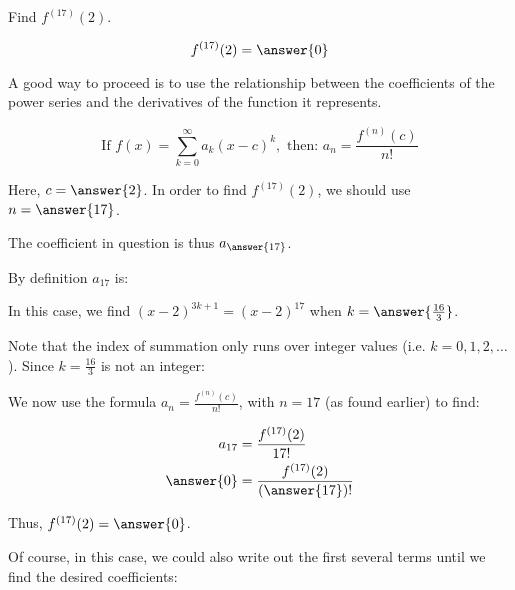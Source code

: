 \documentclass{ximera}
\begin{document}
\begin{exercise}
\begin{exercise}
Find $f^{(17)}(2)$.

\[
f^{(17)}(2) = \answer{0}
\]


\begin{hint}
A good way to proceed is to use the relationship between the coefficients of the power series and the derivatives of the function it represents.

\[
\textrm{If } f(x) = \sum_{k=0}^{\infty} a_k(x-c)^k, \textrm{ then: } a_n = \frac{f^{(n)}(c)}{n!}
\]

Here, $c=\answer{2}$.  In order to find $f^{(17)}(2)$, we should use $n=\answer{17}$.

The coefficient in question is thus $a_{\answer{17}}$.  

\begin{question}
By definition $a_{17}$ is:

\begin{multipleChoice}
\end{multipleChoice}

In this case, we find $(x-2)^{3k+1}=(x-2)^{17}$ when $k=\answer{\frac{16}{3}}$.  

\begin{question}
Note that the index of summation only runs over integer values (i.e. $k=0,1,2,\ldots$). Since $k=\frac{16}{3}$ is not an integer:

\begin{multipleChoice}
\end{multipleChoice}

\begin{question}
We now use the formula $a_n = \frac{f^{(n)}(c)}{n!}$, with $n=17$ (as found earlier) to find:

\begin{align*}
a_{17} &= \frac{f^{(17)}(2)}{17!} \\
\answer{0} &= \frac{f^{(17)}(2)}{\left(\answer{17}\right)!}
\end{align*}

Thus, $f^{(17)}(2) = \answer{0}$.
\end{question}
\end{question}
\end{question}
\end{hint}

\begin{exercise}
Of course, in this case, we could also write out the first several terms until we find the desired coefficients:


\end{exercise}
\end{exercise}
\end{exercise}
\end{document}
